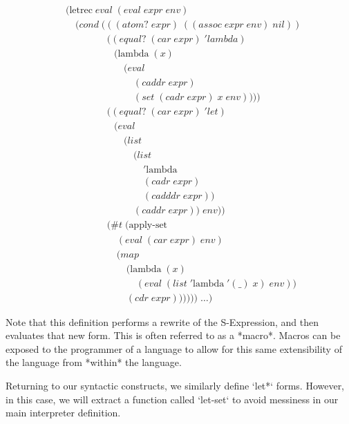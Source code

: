 \begin{align*}
& (\text{letrec} \; eval \; (eval \; expr \; env)
\\& \quad (cond \; (((atom? \; expr) \; ((assoc \; expr \; env) \; nil))
\\& \qquad \qquad \; ((equal? \; (car \; expr) \; 'lambda) \; 
\\& \qquad \qquad \quad (\text{lambda} \; (x) \; 
\\& \qquad \qquad \qquad (eval \; 
\\& \qquad \qquad \qquad \quad (caddr \; expr) \; 
\\& \qquad \qquad \qquad \quad (set \; (cadr \; expr) \; x \; env))))
\\& \qquad \qquad \; ((equal? \; (car \; expr) \; 'let)
\\& \qquad \qquad \quad (eval \; 
\\& \qquad \qquad \qquad (list \; 
\\& \qquad \qquad \qquad \quad (list \; 
\\& \qquad \qquad \qquad \qquad '\text{lambda} \; 
\\& \qquad \qquad \qquad \qquad (cadr \; expr) \; 
\\& \qquad \qquad \qquad \qquad (cadddr \; expr)) \; 
\\& \qquad \qquad \qquad \quad (caddr \; expr)) \; env))
\\& \qquad \qquad \; (\#t \; (\text{apply-set} \; 
\\& \qquad \qquad \quad \; (eval \; (car \; expr) \; env) \; 
\\& \qquad \qquad \quad \; (map \; 
\\& \qquad \qquad \qquad \; (\text{lambda} \; (x) \; 
\\& \qquad \qquad \qquad \quad \; (eval \; (list \; '\text{lambda} \; '(\_) \; x) \; env)) \; 
\\& \qquad \qquad \qquad \; (cdr \; expr)))))) \; \dots)
\end{align*}

Note that this definition performs a rewrite of the S-Expression, and then
evaluates that new form. This is often referred to as a *macro*. Macros can
be exposed to the programmer of a language to allow for this same 
extensibility of the language from *within* the language.

Returning to our syntactic constructs, we similarly define `let*` forms. 
However, in this case, we will extract a function called `let-set` to avoid 
messiness in our main interpreter definition.

